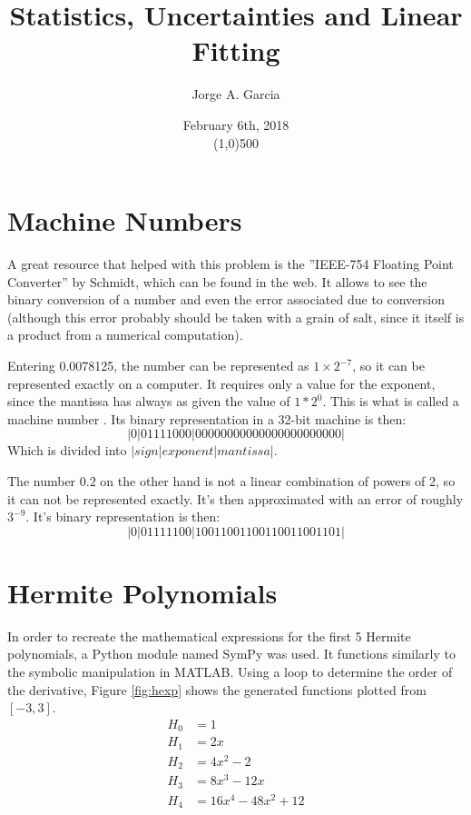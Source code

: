 \documentclass[twocolumn]{article}
\title{Statistics, Uncertainties and Linear Fitting}
\author{Jorge A. Garcia}
\date{February 6th, 2018\\\line(1,0){500}}
\begin{document}
\maketitle

\section{Machine Numbers}

A great resource that helped with this problem is the ''IEEE-754 Floating Point Converter'' by Schmidt, which can be found in the web. It allows to see the binary
conversion of a number and even the error associated due to conversion (although this error probably should be taken with a grain of salt, since it itself is a product
from a numerical computation).

Entering 0.0078125, the number can be represented as $1\times2^{-7}$, so it can be represented exactly on a computer. It requires only a value for the exponent, since
the mantissa has always as given the value of $1*2^0$. This is what is called a machine number \cite{hjorth}. Its binary representation in a 32-bit machine is then:
\begin{equation*}
 |0|01111000|00000000000000000000000|
\end{equation*}
Which is divided into $|sign|exponent|mantissa|$.

The number $0.2$ on the other hand is not a linear combination of powers of 2, so it can not be represented exactly. It's then approximated with an error of roughly
$3^{-9}$. It's binary representation is then:
\begin{equation*}
  |0|01111100|10011001100110011001101|
\end{equation*}


\section{Hermite Polynomials}

In order to recreate the mathematical expressions for the first 5 Hermite polynomials, a Python module named SymPy was used. It functions similarly to the symbolic
manipulation in MATLAB. Using a loop to determine the order of the derivative, Figure \ref{fig:hexp} shows the generated functions plotted from $[-3,3]$.
\begin{align*}
 H_0 &= 1 \\
 H_1 &= 2x \\
 H_2 &= 4x^2-2 \\
 H_3 &= 8x^3 - 12x \\
 H_4 &= 16x^4 - 48x^2 + 12
\end{align*}
\end{document}
